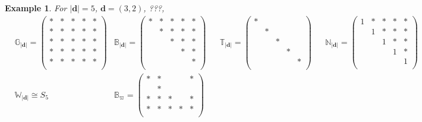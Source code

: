 \documentclass[reqno,11pt]{book}
\numberwithin{equation}{section}
\theoremstyle{plain}
\newtheorem{eg}[theorem]{Example}
\theoremstyle{plain}
\numberwithin{equation}{section}
\theoremstyle{remark}
\newcommand{\dimvec}[1]{\mathbf{#1}}
\newcommand{\abdimvec}[1]{|\dimvec{#1}|}
\newcommand{\absgp}[1]{\mathbb{#1}}
\newcommand{\ww}{\varpi}
\begin{document}
\makeatletter
\renewcommand*\env@matrix[1][*\c@MaxMatrixCols c]{%
  \hskip -\arraycolsep
  \let\@ifnextchar\new@ifnextchar
  \array{#1}}
\makeatother
\begin{eg}
For $\abdimvec{d}=5$, $\dimvec{d}=(3,2)$, ???,
\begin{equation*}
\begin{aligned}
  &\absgp{G}_{\abdimvec{d}}= \begin{pmatrix}
  * & * & * & * & * \\
  * & * & * & * & * \\
  * & * & * & * & * \\
  * & * & * & * & * \\
  * & * & * & * & * \\
  \end{pmatrix}&
  \absgp{B}_{\abdimvec{d}}=
  \begin{pmatrix}
  * & * & * & * & * \\
   & * & * & * & * \\
   &  & * & * & * \\
   &  &  & * & * \\
   &  &  &  & * \\
  \end{pmatrix}&&
  \absgp{T}_{\abdimvec{d}}=
  \begin{pmatrix}
  * &  &  &  &  \\
   & * &  &  &  \\
   &  & * &  &  \\
   &  &  & * &  \\
   &  &  &  & * \\
  \end{pmatrix}&&
  \absgp{N}_{\abdimvec{d}}=
  \begin{pmatrix}
  \scriptstyle 1 & * & * & * & * \\
   & \scriptstyle 1 & * & * & * \\
   &  & \scriptstyle 1 & * & * \\
   &  &  & \scriptstyle 1 & * \\
   &  &  &  & \scriptstyle 1 \\
  \end{pmatrix}
    \\
  &\absgp{W}_{\abdimvec{d}}\cong S_5&
  \absgp{B}_{\ww}=
   \begin{pmatrix}
  * & * &  &  & * \\
   & * &  &  &  \\
  * & * & * &  & * \\
  * & * & * & * & * \\

\end{pmatrix}
\end{aligned}
\end{equation*}
\end{eg}
\end{document}
